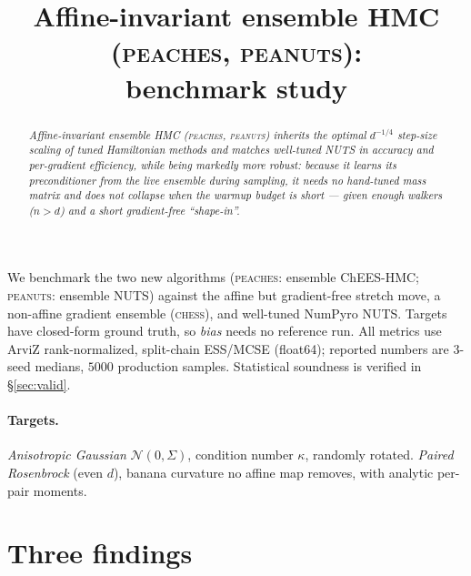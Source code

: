 \documentclass[11pt]{article}
\title{Affine-invariant ensemble HMC (\textsc{peaches}, \textsc{peanuts}):\\
       benchmark study}
\author{}
\date{}
\begin{document}
\maketitle

\begin{abstract}\noindent
\emph{Affine-invariant ensemble HMC (\textsc{peaches}, \textsc{peanuts})
inherits the optimal $d^{-1/4}$ step-size scaling of tuned Hamiltonian
methods and matches well-tuned NUTS in accuracy and per-gradient efficiency,
while being markedly more robust: because it learns its preconditioner from
the live ensemble \emph{during} sampling, it needs no hand-tuned mass matrix
and does not collapse when the warmup budget is short --- given enough
walkers ($n\!>\!d$) and a short gradient-free ``shape-in''.}
\end{abstract}

We benchmark the two new algorithms (\textsc{peaches}: ensemble
ChEES-HMC; \textsc{peanuts}: ensemble NUTS) against the affine but
gradient-free stretch move, a non-affine gradient ensemble (\textsc{chess}),
and well-tuned NumPyro NUTS. Targets have closed-form ground truth, so
\emph{bias} needs no reference run. All metrics use ArviZ rank-normalized,
split-chain ESS/MCSE (float64); reported numbers are 3-seed medians, $5000$
production samples. Statistical soundness is verified in \S\ref{sec:valid}.

\paragraph{Targets.}
\emph{Anisotropic Gaussian} $\mathcal N(0,\Sigma)$, condition number
$\kappa$, randomly rotated. \emph{Paired Rosenbrock} (even $d$),
banana curvature no affine map removes, with analytic per-pair moments.

\section{Three findings}
\end{document}
